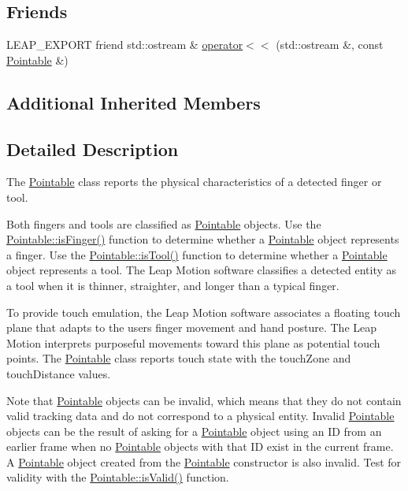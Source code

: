 \subsection*{Friends}
\begin{DoxyCompactItemize}
\item 
L\+E\+A\+P\+\_\+\+E\+X\+P\+O\+RT friend std\+::ostream \& \hyperlink{class_leap_1_1_pointable_a3e0fe2f963f09cfaf2d4dc9b93c85b4d}{operator$<$$<$} (std\+::ostream \&, const \hyperlink{class_leap_1_1_pointable}{Pointable} \&)
\end{DoxyCompactItemize}
\subsection*{Additional Inherited Members}


\subsection{Detailed Description}
The \hyperlink{class_leap_1_1_pointable}{Pointable} class reports the physical characteristics of a detected finger or tool.

Both fingers and tools are classified as \hyperlink{class_leap_1_1_pointable}{Pointable} objects. Use the \hyperlink{class_leap_1_1_pointable_a4631ae19c9389e638c69f462b5bae35a}{Pointable\+::is\+Finger()} function to determine whether a \hyperlink{class_leap_1_1_pointable}{Pointable} object represents a finger. Use the \hyperlink{class_leap_1_1_pointable_a3ad1f5ced8d852a0f35de68c4c559ef3}{Pointable\+::is\+Tool()} function to determine whether a \hyperlink{class_leap_1_1_pointable}{Pointable} object represents a tool. The Leap Motion software classifies a detected entity as a tool when it is thinner, straighter, and longer than a typical finger.


\begin{DoxyCodeInclude}
\end{DoxyCodeInclude}


To provide touch emulation, the Leap Motion software associates a floating touch plane that adapts to the user\textquotesingle{}s finger movement and hand posture. The Leap Motion interprets purposeful movements toward this plane as potential touch points. The \hyperlink{class_leap_1_1_pointable}{Pointable} class reports touch state with the touch\+Zone and touch\+Distance values.

Note that \hyperlink{class_leap_1_1_pointable}{Pointable} objects can be invalid, which means that they do not contain valid tracking data and do not correspond to a physical entity. Invalid \hyperlink{class_leap_1_1_pointable}{Pointable} objects can be the result of asking for a \hyperlink{class_leap_1_1_pointable}{Pointable} object using an ID from an earlier frame when no \hyperlink{class_leap_1_1_pointable}{Pointable} objects with that ID exist in the current frame. A \hyperlink{class_leap_1_1_pointable}{Pointable} object created from the \hyperlink{class_leap_1_1_pointable}{Pointable} constructor is also invalid. Test for validity with the \hyperlink{class_leap_1_1_pointable_afe50d02eb1b4f554a4089c329fda1a45}{Pointable\+::is\+Valid()} function.

